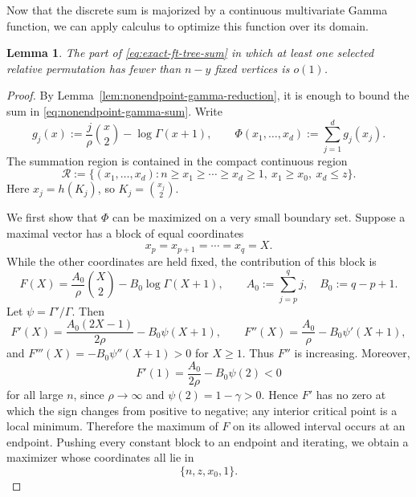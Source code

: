 \documentclass[10pt,a4paper]{amsart}
\newtheorem{lemma}[theorem]{Lemma}
\renewcommand\le{\leqslant}
\renewcommand\ge{\geqslant}
\renewcommand\to{\rightarrow}
\begin{document}
Now that the discrete sum is majorized by a continuous multivariate Gamma function, we can apply calculus to optimize this function over its domain. 


\begin{lemma}\label{lem:nonendpoint-contribution-detailed}
The part of \eqref{eq:exact-ft-tree-sum} in which at least one selected relative permutation has fewer than $n-y$ fixed vertices is $o(1)$.
\end{lemma}

\begin{proof}
By Lemma~\ref{lem:nonendpoint-gamma-reduction}, it is enough to bound the sum in \eqref{eq:nonendpoint-gamma-sum}. Write
\[
        g_j(x):=\frac{j}{\rho}\binom{x}{2}-\log\Gamma(x+1),
        \qquad
        \Phi(x_1,\ldots,x_d):=\sum_{j=1}^d g_j(x_j).
\]
The summation region is contained in the compact continuous region
\begin{equation}\label{eq:continuous-region}
        \mathcal R:=\{(x_1,\ldots,x_d):
        n\ge x_1\ge\cdots\ge x_d\ge1,
        \ x_1\ge x_0,
        \ x_d\le z\}.
\end{equation}
Here $x_j=h(K_j)$, so $K_j=\binom{x_j}{2}$.

We first show that $\Phi$ can be maximized on a very small boundary set. Suppose a maximal vector has a block of equal coordinates
\[
        x_p=x_{p+1}=\cdots=x_q=X.
\]
While the other coordinates are held fixed, the contribution of this block is
\[
        F(X)=\frac{A_0}{\rho}\binom X2-B_0\log\Gamma(X+1),
        \qquad
        A_0:=\sum_{j=p}^q j,
        \quad B_0:=q-p+1.
\]
Let $\psi=\Gamma'/\Gamma$. Then
\[
        F'(X)=\frac{A_0(2X-1)}{2\rho}-B_0\psi(X+1),
        \qquad
        F''(X)=\frac{A_0}{\rho}-B_0\psi'(X+1),
\]
and $F'''(X)=-B_0\psi''(X+1)>0$ for $X\ge1$. Thus $F''$ is increasing. Moreover,
\[
        F'(1)=\frac{A_0}{2\rho}-B_0\psi(2)<0
\]
for all large $n$, since $\rho\to\infty$ and $\psi(2)=1-\gamma>0$. Hence $F'$ has no zero at which the sign changes from positive to negative; any interior critical point is a local minimum. Therefore the maximum of $F$ on its allowed interval occurs at an endpoint. Pushing every constant block to an endpoint and iterating, we obtain a maximizer whose coordinates all lie in
\begin{equation}\label{eq:boundary-set}
        \{n,z,x_0,1\}.
\end{equation}


\end{proof}
\end{document}
